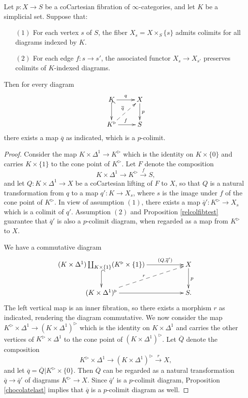 \begin{corollary}\label{constrel}
Let $p: X \rightarrow S$ be a coCartesian fibration of $\infty$-categories, and let $K$ be a simplicial set.
Suppose that:
\begin{itemize}
\item[$(1)$] For each vertex $s$ of $S$, the fiber $X_{s} = X \times_{S} \{s\}$ admits colimits
for all diagrams indexed by $K$.
\item[$(2)$] For each edge $f: s \rightarrow s'$, the associated functor
$X_{s} \rightarrow X_{s'}$ preserves colimits of $K$-indexed diagrams.
\end{itemize}
Then for every diagram
$$ \xymatrix{ K \ar[r]^{q} \ar@{^{(}->}[d] & X \ar[d]^{p} \\
K^{\triangleright} \ar[r]^{f} \ar@{-->}[ur]^{\overline{q}} & S }$$
there exists a map $\overline{q}$ as indicated, which is a $p$-colimit.
\end{corollary}

\begin{proof}
Consider the map $K \times \Delta^1 \rightarrow K^{\triangleright}$ which is the identity on $K \times \{0\}$ and carries $K \times \{1\}$ to the cone point of $K^{\triangleright}$. 
Let $F$ denote the composition
$$ K \times \Delta^1 \rightarrow K^{\triangleright} \stackrel{f}{\rightarrow} S,$$
and let $Q: K \times \Delta^1 \rightarrow X$ be a coCartesian lifting of $F$
to $X$, so that $Q$ is a natural transformation from $q$ to a map
$q': K \rightarrow X_{s}$, where $s$ is the image under $f$ of the cone point of
$K^{\triangleright}$. In view of assumption $(1)$, there exists a map
$\overline{q}': K^{\triangleright} \rightarrow X_{s}$ which is a colimit of $q'$.
Assumption $(2)$ and Proposition \ref{relcolfibtest} guarantee that
$\overline{q}'$ is also a $p$-colimit diagram, when regarded as a map
from $K^{\triangleright}$ to $X$. 

We have a commutative diagram
$$ \xymatrix{ (K \times \Delta^1) \coprod_{ K \times \{1\} } (K^{\triangleright}
\times \{1\} ) \ar[rr]^-{(Q,\overline{q}')} \ar@{^{(}->}[d] & & X \ar[d]^{p} \\
(K \times \Delta^1)^{\triangleright} \ar@{-->}[urr]^{r} \ar[rr] & & S. }$$
The left vertical map is an inner fibration, so there exists a morphism
$r$ as indicated, rendering the diagram commutative. We now consider the map
$ K^{\triangleright} \times \Delta^1 \rightarrow (K \times \Delta^1)^{\triangleright}$
which is the identity on $K \times \Delta^1$ and carries the other vertices of
$K^{\triangleright} \times \Delta^1$ to the cone point of $(K \times \Delta^1)^{\triangleright}$.
Let $\overline{Q}$ denote the composition
$$ K^{\triangleright} \times \Delta^1 \rightarrow (K \times \Delta^1)^{\triangleright}
\stackrel{r}{\rightarrow} X, $$
and let $\overline{q} = \overline{Q} | K^{\triangleright} \times \{0\}$.
Then $\overline{Q}$ can be regarded as a natural transformation
$\overline{q} \rightarrow \overline{q}'$ of diagrams $K^{\triangleright} \rightarrow X$.
Since $\overline{q}'$ is a $p$-colimit diagram, Proposition \ref{chocolatelast}
implies that $\overline{q}$ is a $p$-colimit diagram as well.
\end{proof}

